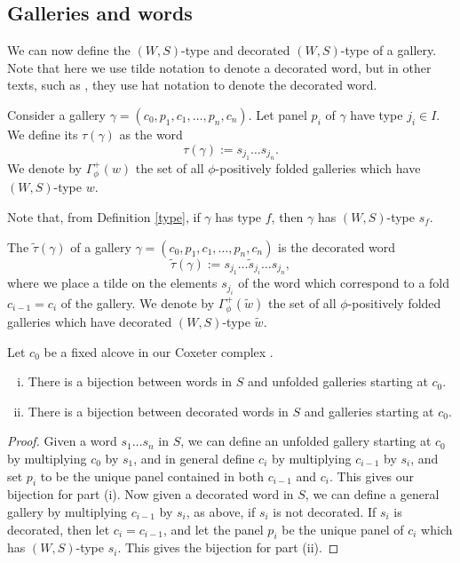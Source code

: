 \documentclass[11pt]{article}
\begin{document}
\subsection{Galleries and words}

We can now define the $(W,S)$-type and decorated $(W,S)$-type of a gallery. Note that here we use tilde notation to denote a decorated word, but in other texts, such as \cite{SHA}, they use hat notation to denote the decorated word.

\begin{definition}
    Consider a gallery $\gamma = (c_0,p_1,c_1,\hdots ,p_n,c_n)$. Let panel $p_i$ of $\gamma$ have type ${j_i}\in I$. We define its  $\tau(\gamma)$ as the word 
    \[\tau(\gamma):=s_{j_1}\hdots s_{j_n}.\]
    We denote by $\Gamma_{\phi}^+(w)$ the set of all $\phi$-positively folded galleries which have $(W,S)$-type $w$. 
\end{definition}

Note that, from Definition \ref{type}, if $\gamma$ has type $f$, then $\gamma$ has $(W,S)$-type $s_f$. 

\begin{definition}
    The  $\tilde\tau(\gamma)$ of a gallery $\gamma = (c_0,p_1,c_1,\hdots ,p_n,c_n)$ is the decorated word
    \[\tilde\tau(\gamma):= s_{j_1}\hdots \tilde{s}_{j_i}\hdots s_{j_n},\]
    where we place a tilde on the elements $s_{j_i}$ of the word which correspond to a fold $c_{i-1}=c_i$ of the gallery. We denote by $\Gamma_{\phi}^+(\tilde{w})$ the set of all $\phi$-positively folded galleries which have decorated $(W,S)$-type $\tilde{w}$.
\end{definition}


\begin{lemma}\cite[p.128]{SHA}
    Let $c_0$ be a fixed alcove in our Coxeter complex \sg. 
    \begin{enumerate}[(i)]
        \item There is a bijection between words in $S$ and unfolded galleries starting at $c_0$.
        \item There is a bijection between decorated words in $S$ and galleries starting at $c_0$. 
    \end{enumerate}
\end{lemma}

\begin{proof}
    Given a word $s_1\hdots s_n$ in $S$, we can define an unfolded gallery starting at $c_0$ by multiplying $c_0$ by $s_1$, and in general define $c_i$ by multiplying $c_{i-1}$ by $s_{i}$, and set $p_i$ to be the unique panel contained in both $c_{i-1}$ and $c_i$. This gives our bijection for part (i). 
    Now given a decorated word in $S$, we can define a general gallery by multiplying $c_{i-1}$ by $s_{i}$, as above, if $s_{i}$ is not decorated. If $s_{i}$ is decorated, then let $c_i=c_{i-1}$, and let the panel $p_i$ be the unique panel of $c_i$ which has $(W,S)$-type $s_i$. This gives the bijection for part (ii). 
\end{proof}
\end{document}
